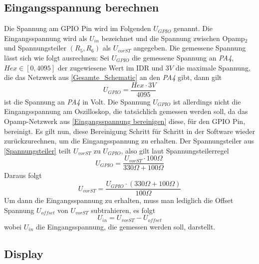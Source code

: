 \subsection{Eingangsspannung berechnen}
Die Spannung am GPIO Pin  wird im Folgenden $U_{GPIO}$ genannt. \newline
Die Eingangsspannung wird als $U_{in}$ bezeichnet und die Spannung zwischen Opamp$_2$
und Spannungsteiler $(R_5, R_6)$ als $U_{vorST}$ angegeben.
\newline \newline
Die gemessene Spannung lässt sich wie folgt ausrechnen: \newline
Sei $U_{GPIO}$ die gemessene Spannung an \textit{PA4}, $Hex \in [0, 4095]$ der zugewiesene Wert im IDR
und $3V$ die maximale Spannung, die das Netzwerk aus \ref{Gesamte_Schematic} an den \textit{PA4} gibt,
dann gilt
$$
	U_{GPIO} = \frac{Hex \cdot 3V}{4095}
$$
ist die Spannung an \textit{PA4} in Volt.
\newline \newline
Die Spannung $U_{GPIO}$ ist allerdings nicht die Eingangsspannung am Oszilloskop, die tatsächlich gemessen werden soll, da
das Opamp-Netzwerk aus \ref{Eingangsspannung bereinigen} diese, für den GPIO Pin, bereinigt.
Es gilt nun, diese Bereinigung Schritt für Schritt in der Software wieder zurückzurechnen, um die Eingangsspannung zu erhalten. \newline
Der Spannungsteiler aus \ref{Spannungsteiler} teilt $U_{vorST}$
zu $U_{GPIO}$, also gilt laut Spannungsteilerregel
$$
	U_{GPIO} = \frac{U_{vorST} \cdot 100 \Omega}{330 \Omega + 100 \Omega}
$$
Daraus folgt
$$
	U_{vorST} = \frac{U_{GPIO} \cdot (330 \Omega + 100 \Omega)}{100 \Omega}
$$
\newline\newline
Um dann die Eingangsspannung zu erhalten, muss man lediglich die Offset Spannung $U_{offset}$
von $U_{vorST}$ subtrahieren, es folgt
$$
	U_{in} = U_{vorST} - U_{offset}
$$
wobei $U_{in}$ die Eingangsspannung, die gemessen werden soll, darstellt.


\subsection{Display}

